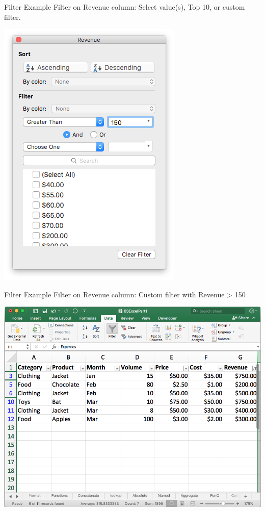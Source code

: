 \documentclass[xcolor=svgnames]{beamer}
\begin{document}
\begin{frame}{Filter Example}
Filter on Revenue column:  Select value(s), Top 10, or custom filter.
\begin{center}
\includegraphics[width=.5\textwidth]{CustomFilter}
\end{center}
\end{frame}


\begin{frame}{Filter Example}
Filter on Revenue column:  Custom filter with Revenue > 150
\begin{center}
 \includegraphics[width=.8\textwidth]{CustomFilter2}
\end{center}
\end{frame}


%
\end{document}
